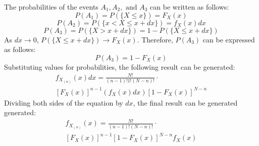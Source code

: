 \documentclass[conference]{IEEEtran}
\begin{document}
The probabilities of the events $A_1,A_2,\text{ and }A_3$ can be written as follows:
\begin{equation}
P(A_1) = P(\{X \leq x\}) = F_X(x)
\end{equation}
\begin{equation}
P(A_2) = P(\{x < X \leq x + dx\}) = f_X(x)dx
\end{equation}
\begin{equation}
P(A_3) = P(\{X > x + dx\}) = 1 - P(\{X \leq x + dx\})
\end{equation}
As $dx \rightarrow 0$, $P(\{X \leq x + dx\}) \rightarrow F_X(x)$. Therefore, $P(A_3)$ can be expressed as follows:
\begin{equation}
P(A_3) = 1 - F_X(x)
\end{equation}
Substituting values for probabilities, the following result can be generated:
\begin{equation}
\begin{gathered}
f_{X_{(n)}}(x)dx=\frac{N!}{(n-1)!1!(N-n)!}\cdot\\
[F_X(x)]^{n-1}(f_X(x)dx)[1-F_X(x)]^{N-n}
\end{gathered}
\end{equation}
Dividing both sides of the equation by $dx$, the final result can be generated generated:
\begin{equation}
\begin{gathered}
f_{X_{(n)}}(x)=\frac{N!}{(n-1)!(N-n)!}\cdot\\
[F_X(x)]^{n-1}[1-F_X(x)]^{N-n}f_X(x)
\end{gathered}
\end{equation}
\end{document}
